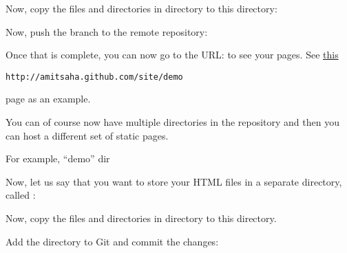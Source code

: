 \documentclass[a4paper,10pt,french]{sphinxmanual}
\begin{document}
\begin{sphinxVerbatim}[commandchars=\\\{\}]
   
\end{sphinxVerbatim}

Now, copy  the files and directories in  directory to this
directory:

\begin{sphinxVerbatim}[commandchars=\\\{\}]
  
   
\end{sphinxVerbatim}

Now, push the  branch to the remote repository:

\begin{sphinxVerbatim}[commandchars=\\\{\}]
   
\end{sphinxVerbatim}

Once that is complete, you can now go to the URL:
 to see your pages. See
\href{http://amitsaha.github.com/site/demo}{this}%
\begin{footnote}[6]\sphinxAtStartFootnote
\nolinkurl{http://amitsaha.github.com/site/demo}
%
\end{footnote} page as an example.

You can of course now have multiple directories in the 
repository and then you can host a different set of static pages.

For example, ``demo'' dir

Now, let us say that you want to store your HTML files in a separate
directory, called :

\begin{sphinxVerbatim}[commandchars=\\\{\}]
 
\end{sphinxVerbatim}

Now, copy  the files and directories in  directory to this
directory.

Add the  directory to Git and commit the changes:
\end{document}
